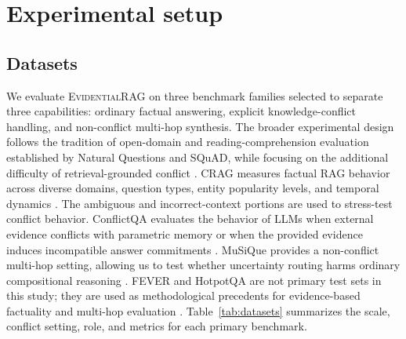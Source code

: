 \documentclass[preprint,12pt,authoryear,nopreprintline]{elsarticle}
\newcommand{\ERAG}{\textsc{EvidentialRAG}}
\begin{document}
\section{Experimental setup}
\label{sec:experiments}


\subsection{Datasets}

We evaluate \ERAG{} on three benchmark families selected to separate three capabilities: ordinary factual answering, explicit knowledge-conflict handling, and non-conflict multi-hop synthesis. The broader experimental design follows the tradition of open-domain and reading-comprehension evaluation established by Natural Questions and SQuAD, while focusing on the additional difficulty of retrieval-grounded conflict \citep{Kwiatkowski2019NQ,Rajpurkar2016SQuAD}. CRAG measures factual RAG behavior across diverse domains, question types, entity popularity levels, and temporal dynamics \citep{Yang2024CRAGBenchmark}. The ambiguous and incorrect-context portions are used to stress-test conflict behavior. ConflictQA evaluates the behavior of LLMs when external evidence conflicts with parametric memory or when the provided evidence induces incompatible answer commitments \citep{Xie2024ConflictQA}. MuSiQue provides a non-conflict multi-hop setting, allowing us to test whether uncertainty routing harms ordinary compositional reasoning \citep{Trivedi2022MuSiQue}. FEVER and HotpotQA are not primary test sets in this study; they are used as methodological precedents for evidence-based factuality and multi-hop evaluation \citep{Thorne2018FEVER,Yang2018HotpotQA}. Table~\ref{tab:datasets} summarizes the scale, conflict setting, role, and metrics for each primary benchmark.
\end{document}

